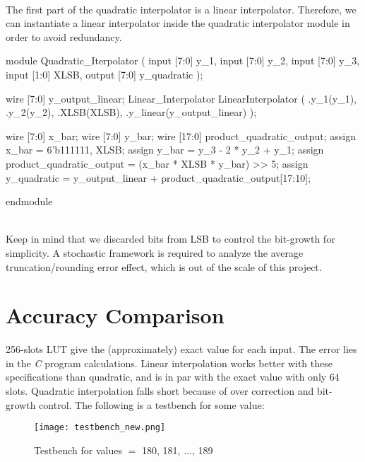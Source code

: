 \documentclass{article}
\let\oldsection\section
\renewcommand{\section}{%
    \setcounter{subsection}{0}%
    \oldsection%
}
\begin{document}
~\\ The first part of the quadratic interpolator is a linear interpolator. Therefore, we can instantiate a linear interpolator inside the quadratic interpolator module in order to avoid redundancy.
\begin{vcode}
module Quadratic_Iterpolator (
    input [7:0] y_1,
    input [7:0] y_2,
    input [7:0] y_3,
    input [1:0] XLSB,
    output [7:0] y_quadratic
    );
	
    wire [7:0] y_output_linear;
    Linear_Interpolator LinearInterpolator (
        .y_1(y_1), 
        .y_2(y_2), 
        .XLSB(XLSB), 
        .y_linear(y_output_linear)
    );
	
    wire [7:0] x_bar;
    wire [7:0] y_bar;
    wire [17:0] product_quadratic_output;
    assign x_bar = {6'b111111, XLSB};
    assign y_bar = y_3 - 2 * y_2 + y_1;
    assign product_quadratic_output = (x_bar * XLSB * y_bar) >> 5;
    assign y_quadratic = y_output_linear + product_quadratic_output[17:10];

endmodule
\end{vcode}
~\\Keep in mind that we discarded bits from LSB to control the bit-growth for simplicity. A stochastic framework is required to analyze the average truncation/rounding error
effect, which is out of the scale of this project.
\section{Accuracy Comparison}
256-slots LUT give the (approximately) exact value for each input. The error lies in the \textsl{C} program calculations. Linear interpolation works better with these specifications than quadratic, and is in par with the exact value with only 64 slots. Quadratic interpolation falls short because of over correction and bit-growth control. The following is a testbench for some value:
\begin{figure}[h!]
    \texttt{[image: testbench\_new.png]}
    \caption{Testbench for values $=$ 180, 181, $\dots$, 189}
    \label{fig:my_label}
\end{figure}
\end{document}
